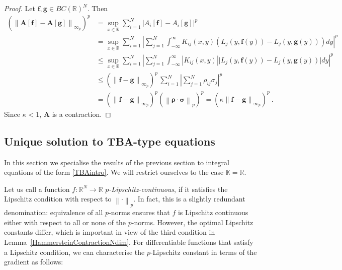 \documentclass[12pt]{article}
\theoremstyle{plain}
\theoremstyle{definition}
\numberwithin{equation}{section}
\numberwithin{theorem}{section}
\renewcommand{\vec}[1]{\mathbf{#1}}
\begin{document}
\begin{proof} Let $\vec{f},\vec{g}\in BC(\mathbb{R})^N$. Then
\allowdisplaybreaks
\begin{align}
\left(\left\| \vec{A}[\vec{f}]-\vec{A}[\vec{g}] \right\|_{\infty_p}\right)^p &= \sup_{x\in\mathbb{R}} \sum_{i=1}^N \left|A_i[\vec{f}]-A_i[\vec{g}]\right|^p \nonumber\\
&= \sup_{x\in\mathbb{R}} \sum_{i=1}^N \left|\sum_{j=1}^N\int_{-\infty}^{\infty} K_{ij}(x,y)\left(L_j(y,\vec{f}(y))-L_j(y,\vec{g}(y))\right) dy\right|^p \nonumber\\
&\leq \sup_{x\in\mathbb{R}} \sum_{i=1}^N \left|\sum_{j=1}^N\int_{-\infty}^{\infty} \left|K_{ij}(x,y)\right|\big|L_j(y,\vec{f}(y))-L_j(y,\vec{g}(y))\big| dy\right|^p \nonumber\\
&\leq \left(\left\|\vec{f}-\vec{g}\right\|_{\infty_p}\right)^p \,\sum_{i=1}^N \left|\sum_{j=1}^N \rho_{ij}\sigma_j\right|^p
 \nonumber \\
&= \left(\left\|\vec{f}-\vec{g}\right\|_{\infty_p}\right)^p \left(\left\|\boldsymbol\rho\cdot\boldsymbol\sigma\right\|_p\right)^p 
=\left(\kappa \left\|\vec{f}-\vec{g}\right\|_{\infty_p}\right)^p  \ .
\end{align}
Since $\kappa<1$, $\vec{A}$ is a contraction.
\end{proof}



\subsection{Unique solution to TBA-type equations}
\label{section:TBAuniqueness}


In this section we specialise the results of the previous section to integral equations of the form \eqref{TBAintro}. We will restrict ourselves to the case $\mathbb{K} = \mathbb{R}$.

Let us call a function $f:\mathbb{R}^N\rightarrow\mathbb{R}$ \textsl{$p$-Lipschitz-continuous}, if it satisfies the Lipschitz condition with respect to $\left\|\cdot\right\|_p$. In fact, this is a slightly redundant denomination: equivalence of all $p$-norms ensures that $f$ is Lipschitz continuous either with respect to all or none of the $p$-norms. However, the optimal Lipschitz constants differ, which is important in view of the third condition in 
	Lemma~\ref{HammersteinContractionNdim}.
 For differentiable functions that satisfy a Lipschitz condition, we can characterise the $p$-Lipschitz constant in terms of the gradient as follows:
\end{document}
